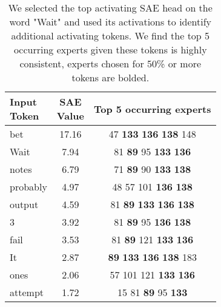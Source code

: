 \begin{table}[]
    \centering
    \begin{tabular}{lcc}
        \makecell{Input \\ Token} & \makecell{SAE \\ Value}  & Top 5 occurring experts \\
        \toprule
        bet      & 17.16  & 47 \hfill \textbf{133} \hfill \textbf{136} \hfill \textbf{138} \hfill 148\\
         Wait     & 7.94   & 81 \hfill \textbf{89} \hfill 95 \hfill \textbf{133} \hfill \textbf{136}\\
         notes    & 6.79   & 71 \hfill \textbf{89} \hfill 90 \hfill \textbf{133} \hfill \textbf{138}\\
         probably & 4.97   & 48 \hfill 57 \hfill 101 \hfill \textbf{136} \hfill \textbf{138}\\
         output   & 4.59   & 81 \hfill \textbf{89} \hfill \textbf{133} \hfill \textbf{136} \hfill \textbf{138}\\
         3        & 3.92   & 81 \hfill \textbf{89} \hfill 95 \hfill \textbf{136} \hfill \textbf{138}\\
         fail     & 3.53   & 81 \hfill \textbf{89} \hfill 121 \hfill \textbf{133} \hfill \textbf{136}\\
         It       & 2.87   & \textbf{89} \hfill \textbf{133} \hfill \textbf{136} \hfill \textbf{138} \hfill 183\\
         ones     & 2.06   & 57 \hfill 101 \hfill 121 \hfill \textbf{133} \hfill \textbf{136}\\
         attempt  & 1.72   & 15 \hfill 81 \hfill \textbf{89} \hfill 95 \hfill \textbf{133}\\

        \bottomrule
    \end{tabular}
    \caption{We selected the top activating SAE head on the word "Wait" and used its activations to identify additional activating tokens. We find the top 5 occurring experts given these tokens is highly consistent, experts chosen for 50\% or more tokens are bolded.}
    \vspace{-1em}

    \label{tab:sae_Wait_main}
\end{table}
